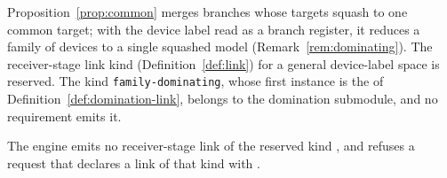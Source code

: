 
Proposition~\ref{prop:common} merges branches whose targets squash to one
common target; with the device label read as a branch register, it reduces a
family of devices to a single squashed model
(Remark~\ref{rem:dominating}). The receiver-stage link kind
(Definition~\ref{def:link}) for a general device-label space is reserved. The
kind \texttt{family-dominating}, whose first instance is the 
of Definition~\ref{def:domination-link}, belongs to the domination submodule,
and no requirement emits it.

\begin{requirement}\label{req:reserved-link-kinds}
The engine emits no receiver-stage link of the reserved kind
, and refuses a request that declares a link of that kind
with .
\end{requirement}
